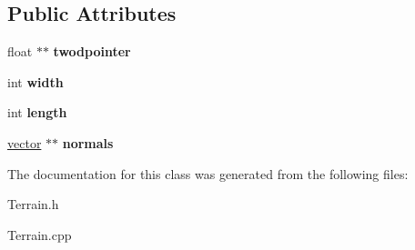 \subsection*{\-Public \-Attributes}
\begin{DoxyCompactItemize}
\item 
\hypertarget{classTerrain_ab19ceea2910662a8f876b2afa19d2673}{float $\ast$$\ast$ {\bfseries twodpointer}}\label{classTerrain_ab19ceea2910662a8f876b2afa19d2673}

\item 
\hypertarget{classTerrain_a53beea1f5b3421259bc95845fccc7c44}{int {\bfseries width}}\label{classTerrain_a53beea1f5b3421259bc95845fccc7c44}

\item 
\hypertarget{classTerrain_ad2c71fd65d9dcd1ef5c0508631d3f7b0}{int {\bfseries length}}\label{classTerrain_ad2c71fd65d9dcd1ef5c0508631d3f7b0}

\item 
\hypertarget{classTerrain_ab48c6f5a224642c7e415cf397d7c0ee1}{\hyperlink{classvector}{vector} $\ast$$\ast$ {\bfseries normals}}\label{classTerrain_ab48c6f5a224642c7e415cf397d7c0ee1}

\end{DoxyCompactItemize}


\-The documentation for this class was generated from the following files\-:\begin{DoxyCompactItemize}
\item 
\-Terrain.\-h\item 
\-Terrain.\-cpp\end{DoxyCompactItemize}
